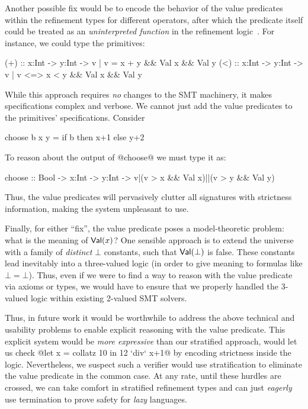 %
Another possible fix would be to encode the behavior of the
value predicates within the refinement types for different 
operators, after which the predicate itself could be treated 
as an \emph{uninterpreted function} in the refinement 
logic~\cite{bradleybook}. For instance, we could type 
the primitives:
%
\begin{code}
 (+) :: x:Int -> y:Int
     -> {v | v  =  x + y && Val x && Val y}
 (<) :: x:Int -> y:Int 
     -> {v | v <=> x < y && Val x && Val y}
\end{code}
%
While this approach requires \emph{no} changes to the SMT 
machinery, it makes specifications complex and verbose. 
%
%
We cannot just add the value predicates to the primitives' 
specifications. Consider 
%
\begin{code}
 choose b x y = if b then x+1 else y+2
\end{code}
%
To reason about the output of @choose@ we must type it as:
%
\begin{code}
 choose :: Bool -> x:Int -> y:Int
        -> {v|(v > x && Val x)||(v > y && Val y)}  
\end{code}
%
Thus, the value predicates will pervasively clutter all 
signatures with strictness information, making the system 
unpleasant to use.


Finally, for either ``fix'', the value predicate poses a 
model-theoretic problem: 
what is the meaning of $\mathsf{Val}(x)$? 
%
One sensible approach is to extend the universe with a family of 
\emph{distinct} $\bot$ constants, such that $\mathsf{Val}(\bot)$ is false.
%
These constants lead inevitably into a three-valued logic 
(in order to give meaning to formulas like $\bot = \bot$).
%
Thus, even if we were to find a way to reason with the value 
predicate via axioms or types, we would have to ensure that 
we properly handled the 3-valued logic within 
existing 2-valued SMT solvers.

Thus, in future work it would be worthwhile to address the above 
technical and usability problems to enable explicit reasoning with 
the value predicate.
%
This explicit system would be \emph{more expressive} than our 
stratified approach, \eg would let us check 
%
  @let x = collatz 10 in 12 `div` x+1@
%
by encoding strictness inside the logic. Nevertheless, we suspect
such a verifier would use stratification to eliminate the value
predicate in the common case.
%
At any rate, until these hurdles are crossed, we can take comfort in
stratified refinement types and can just \emph{eagerly}
use termination to prove safety for \emph{lazy} languages.

